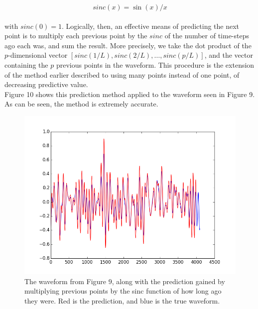 \documentclass{amsart}
\begin{document}
$$sinc(x) = \sin(x)/x$$ \\

with $sinc(0) = 1$. Logically, then, an effective means of predicting the next point is to multiply each previous point by the $sinc$ of the number of time-steps ago each was, and sum the result. More precisely, we take the dot product of the $p$-dimensional vector $[sinc(1/L), sinc(2/L), \dots, sinc(p/L)]$, and the vector containing the $p$ previous points in the waveform. This procedure is the extension of the method earlier described to using many points instead of one point, of decreasing predictive value. \\

Figure 10 shows this prediction method applied to the waveform seen in Figure 9. As can be seen, the method is extremely accurate.

\begin{figure} 
\begin{center} 
\includegraphics[scale=0.4]{oversampledwaveformwithprediction.png} 
\caption{The waveform from Figure 9, along with the prediction gained by multiplying previous points by the sinc function of how long ago they were. Red is the prediction, and blue is the true waveform.
}
\end{center}
\end{figure}
\end{document}
